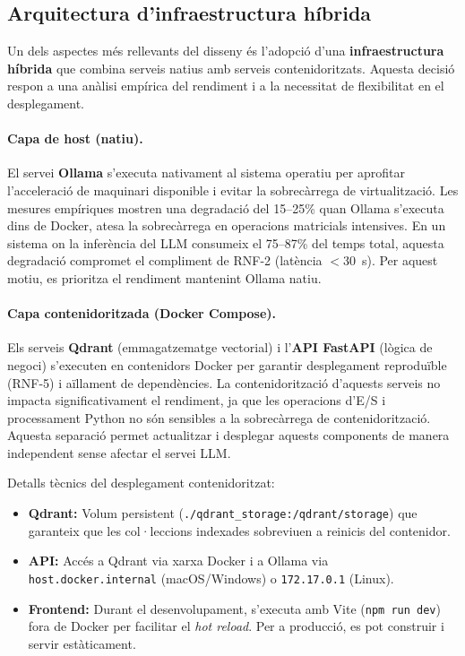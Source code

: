 \documentclass[CAT]{TFUOC}%
\begin{document}
\subsection{Arquitectura d'infraestructura híbrida}

Un dels aspectes més rellevants del disseny és l'adopció d'una \textbf{infraestructura híbrida} que combina serveis natius amb serveis contenidoritzats. Aquesta decisió respon a una anàlisi empírica del rendiment i a la necessitat de flexibilitat en el desplegament.

\paragraph{Capa de host (natiu).}

El servei \textbf{Ollama} s'executa nativament al sistema operatiu per aprofitar l'acceleració de maquinari disponible i evitar la sobrecàrrega de virtualització. Les mesures empíriques mostren una degradació del 15--25\% quan Ollama s'executa dins de Docker, atesa la sobrecàrrega en operacions matricials intensives. En un sistema on la inferència del LLM consumeix el 75--87\% del temps total, aquesta degradació compromet el compliment de RNF-2 (latència $<$30~s). Per aquest motiu, es prioritza el rendiment mantenint Ollama natiu.

\paragraph{Capa contenidoritzada (Docker Compose).}

Els serveis \textbf{Qdrant} (emmagatzematge vectorial) i l'\textbf{API FastAPI} (lògica de negoci) s'executen en contenidors Docker per garantir desplegament reproduïble (RNF-5) i aïllament de dependències. La contenidorització d'aquests serveis no impacta significativament el rendiment, ja que les operacions d'E/S i processament Python no són sensibles a la sobrecàrrega de contenidorització. Aquesta separació permet actualitzar i desplegar aquests components de manera independent sense afectar el servei LLM.

Detalls tècnics del desplegament contenidoritzat:

\begin{itemize}
    \item \textbf{Qdrant:} Volum persistent (\texttt{./qdrant\_storage:/qdrant/storage}) que garanteix que les col·leccions indexades sobreviuen a reinicis del contenidor.
    \item \textbf{API:} Accés a Qdrant via xarxa Docker i a Ollama via \texttt{host.docker.internal} (macOS/Windows) o \texttt{172.17.0.1} (Linux).
    \item \textbf{Frontend:} Durant el desenvolupament, s'executa amb Vite (\texttt{npm run dev}) fora de Docker per facilitar el \textit{hot reload}. Per a producció, es pot construir i servir estàticament.
\end{itemize}
\end{document}
